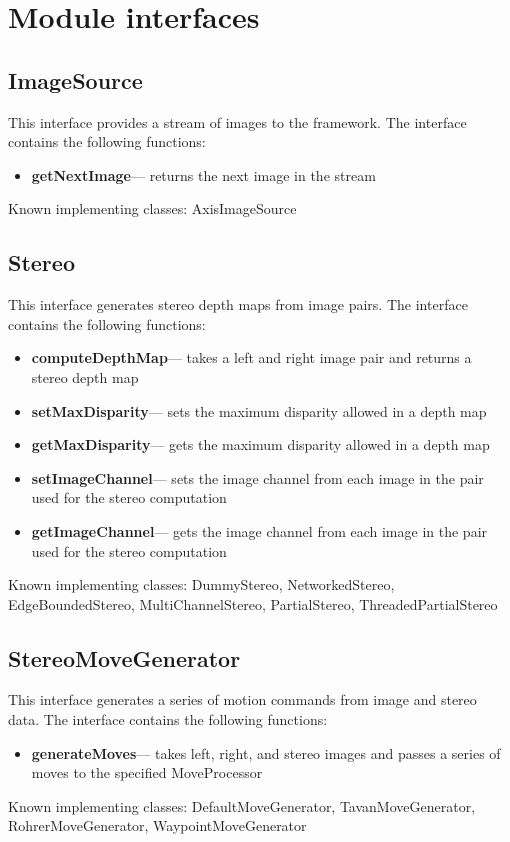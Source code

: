 \documentclass[12pt]{article}
\begin{document}
\section{Module interfaces}

\subsection{ImageSource}
This interface provides a stream of images to the framework.  The interface contains the following functions:

\begin{itemize}
\item {\bf getNextImage}--- returns the next image in the stream
\end{itemize}
Known implementing classes:  AxisImageSource

\subsection{Stereo}
This interface generates stereo depth maps from image pairs.  The interface contains the following functions:

\begin{itemize}
\item {\bf computeDepthMap}--- takes a left and right image pair and returns a stereo depth map 
\item {\bf setMaxDisparity}--- sets the maximum disparity allowed in a depth map
\item {\bf getMaxDisparity}--- gets the maximum disparity allowed in a depth map
\item {\bf setImageChannel}--- sets the image channel from each image in the pair used for the stereo computation
\item {\bf getImageChannel}--- gets the image channel from each image in the pair used for the stereo computation
\end{itemize}
Known implementing classes:  DummyStereo, NetworkedStereo, EdgeBoundedStereo, MultiChannelStereo, PartialStereo, ThreadedPartialStereo 

\subsection{StereoMoveGenerator}
This interface generates a series of motion commands from image and stereo data.  The interface contains the following functions:

\begin{itemize}
\item {\bf generateMoves}--- takes left, right, and stereo images and passes a series of moves to the specified MoveProcessor 
\end{itemize}
Known implementing classes:  DefaultMoveGenerator, TavanMoveGenerator, RohrerMoveGenerator, WaypointMoveGenerator
\end{document}
